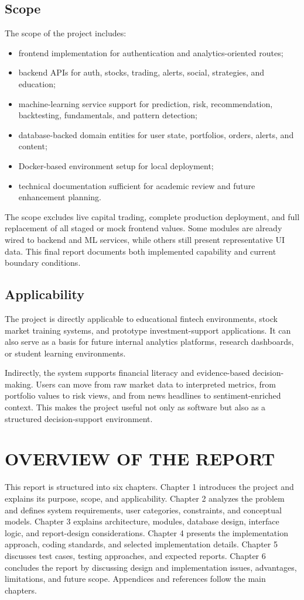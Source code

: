 \documentclass[12pt,a4paper]{report}
\begin{document}
\subsection{Scope}
The scope of the project includes:
\begin{itemize}
\item frontend implementation for authentication and analytics-oriented routes;
\item backend APIs for auth, stocks, trading, alerts, social, strategies, and education;
\item machine-learning service support for prediction, risk, recommendation, backtesting, fundamentals, and pattern detection;
\item database-backed domain entities for user state, portfolios, orders, alerts, and content;
\item Docker-based environment setup for local deployment;
\item technical documentation sufficient for academic review and future enhancement planning.
\end{itemize}

The scope excludes live capital trading, complete production deployment, and full replacement of all staged or mock frontend values. Some modules are already wired to backend and ML services, while others still present representative UI data. This final report documents both implemented capability and current boundary conditions.

\subsection{Applicability}
The project is directly applicable to educational fintech environments, stock market training systems, and prototype investment-support applications. It can also serve as a basis for future internal analytics platforms, research dashboards, or student learning environments.

Indirectly, the system supports financial literacy and evidence-based decision-making. Users can move from raw market data to interpreted metrics, from portfolio values to risk views, and from news headlines to sentiment-enriched context. This makes the project useful not only as software but also as a structured decision-support environment.

\section{OVERVIEW OF THE REPORT}
This report is structured into six chapters. Chapter 1 introduces the project and explains its purpose, scope, and applicability. Chapter 2 analyzes the problem and defines system requirements, user categories, constraints, and conceptual models. Chapter 3 explains architecture, modules, database design, interface logic, and report-design considerations. Chapter 4 presents the implementation approach, coding standards, and selected implementation details. Chapter 5 discusses test cases, testing approaches, and expected reports. Chapter 6 concludes the report by discussing design and implementation issues, advantages, limitations, and future scope. Appendices and references follow the main chapters.
\end{document}
